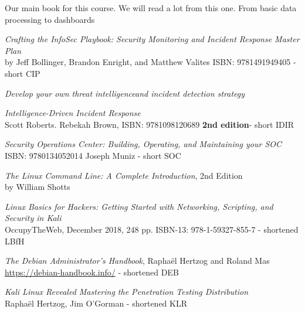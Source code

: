 \documentclass[Screen16to9,17pt]{foils}
\begin{document}
Our main book for this course. We will read a lot from this one. From basic data processing to dashboards



\emph{Crafting the InfoSec Playbook: Security Monitoring and Incident Response Master Plan}\\
 by Jeff Bollinger, Brandon Enright, and Matthew Valites ISBN: 9781491949405 - short CIP

\emph{Develop your own threat intelligenceand incident detection strategy}



\emph{Intelligence-Driven Incident Response} \\
  Scott Roberts. Rebekah Brown, ISBN: 9781098120689 {\bf 2nd edition}- short IDIR





\emph{Security Operations Center: Building, Operating, and Maintaining your SOC}\\
ISBN: 9780134052014 Joseph Muniz - short SOC


\begin{list2}
\item \emph{The Linux Command Line: A Complete Introduction}, 2nd Edition\\
 by William Shotts
\item \emph{Linux Basics for Hackers: Getting Started with Networking, Scripting, and Security in Kali}\\
OccupyTheWeb, December 2018, 248 pp. ISBN-13: 978-1-59327-855-7 - shortened LBfH
\item \emph{The Debian Administrator’s Handbook}, Raphaël Hertzog and Roland Mas\\
\url{https://debian-handbook.info/} - shortened DEB
\item \emph{Kali Linux Revealed  Mastering the Penetration Testing Distribution}\\
Raphaël Hertzog, Jim O'Gorman - shortened KLR
\end{list2}

\end{document}
